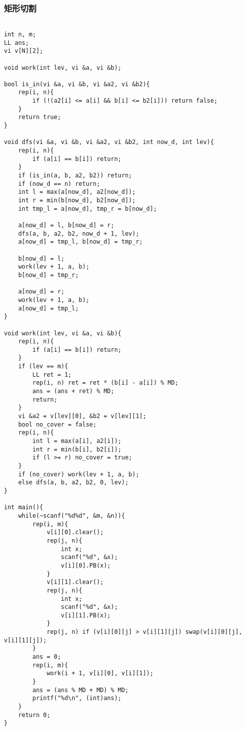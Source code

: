 \subsubsection{矩形切割}
\begin{verbatim}

int n, m;
LL ans;
vi v[N][2];

void work(int lev, vi &a, vi &b);

bool is_in(vi &a, vi &b, vi &a2, vi &b2){
	rep(i, n){
		if (!(a2[i] <= a[i] && b[i] <= b2[i])) return false;
	}
	return true;
}

void dfs(vi &a, vi &b, vi &a2, vi &b2, int now_d, int lev){
	rep(i, n){
		if (a[i] == b[i]) return;
	}
	if (is_in(a, b, a2, b2)) return;
	if (now_d == n) return;
	int l = max(a[now_d], a2[now_d]);
	int r = min(b[now_d], b2[now_d]);
	int tmp_l = a[now_d], tmp_r = b[now_d];

	a[now_d] = l, b[now_d] = r;
	dfs(a, b, a2, b2, now_d + 1, lev);
	a[now_d] = tmp_l, b[now_d] = tmp_r;

	b[now_d] = l;
	work(lev + 1, a, b);
	b[now_d] = tmp_r;

	a[now_d] = r;
	work(lev + 1, a, b);
	a[now_d] = tmp_l;
}

void work(int lev, vi &a, vi &b){
	rep(i, n){
		if (a[i] == b[i]) return;
	}
	if (lev == m){
		LL ret = 1;
		rep(i, n) ret = ret * (b[i] - a[i]) % MD;
		ans = (ans + ret) % MD;
		return;
	}
	vi &a2 = v[lev][0], &b2 = v[lev][1];
	bool no_cover = false;
	rep(i, n){
		int l = max(a[i], a2[i]);
		int r = min(b[i], b2[i]);
		if (l >= r) no_cover = true;
	}
	if (no_cover) work(lev + 1, a, b);
	else dfs(a, b, a2, b2, 0, lev);
}

int main(){
	while(~scanf("%d%d", &m, &n)){
		rep(i, m){
			v[i][0].clear();
			rep(j, n){
				int x;
				scanf("%d", &x);
				v[i][0].PB(x);
			}
			v[i][1].clear();
			rep(j, n){
				int x;
				scanf("%d", &x);
				v[i][1].PB(x);
			}
			rep(j, n) if (v[i][0][j] > v[i][1][j]) swap(v[i][0][j], v[i][1][j]);
		}
		ans = 0;
		rep(i, m){
			work(i + 1, v[i][0], v[i][1]);
		}
		ans = (ans % MD + MD) % MD;
		printf("%d\n", (int)ans);
	}
	return 0;
}
\end{verbatim}
